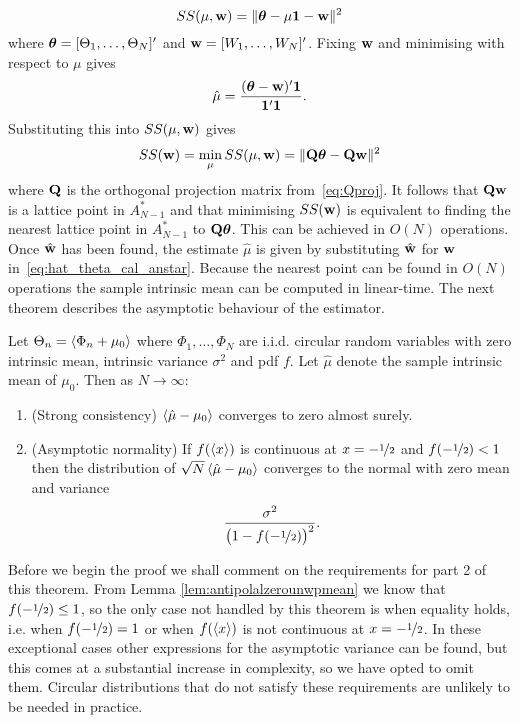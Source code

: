 \documentclass[journal]{../bib/IEEEtran}
\begin{document}
\[
SS(\mu, \mathbf{w}) = \| \boldsymbol{\theta} - \mu\boldsymbol{1} - \mathbf{w} \|^2
\]
where $\boldsymbol{\theta} = [\Theta_1, \dots, \Theta_N]^\prime$ and $\mathbf{w} = [W_1, \dots, W_N]^\prime$.  Fixing $\mathbf{w}$ and minimising with respect to $\mu$ gives
\begin{equation} \label{eq:hat_theta_cal_anstar}
\hat{\mu} = \frac{\dotprod{(\thetabf - \wbf)}{\onebf}}{\dotprod{\onebf}{\onebf}}.
\end{equation}
Substituting this into $SS(\mu, \mathbf{w})$ gives
\[
SS(\mathbf{w}) = \min_{\mu}SS(\mu, \mathbf{w}) = \| \mathbf{Q}\boldsymbol{\theta} - \mathbf{Q}\mathbf{w} \|^2
\]
where $\mathbf{Q}$ is the orthogonal projection matrix from~\eqref{eq:Qproj}. It follows  that $\mathbf{Q}\mathbf{w}$ is a lattice point in $A_{N-1}^*$ and that minimising $SS(\mathbf{w})$ is equivalent to finding the nearest lattice point in $A_{N-1}^*$ to $\mathbf{Q}\boldsymbol{\theta}$.  This can be achieved in $O(N)$ operations. Once $\hat{\mathbf{w}}$ has been found, the estimate $\hat{\mu}$ is given by substituting $\hat{\mathbf{w}}$ for $\mathbf{w}$ in~\eqref{eq:hat_theta_cal_anstar}.  Because the nearest point can be found in $O(N)$ operations the sample intrinsic mean can be computed in linear-time. The next theorem describes the asymptotic behaviour of the estimator.

\begin{theorem}\label{thm:asymp_proof_m=0}
Let $\Theta_n = \left< \Phi_n + \mu_0 \right>$ where $\Phi_1, \dots, \Phi_N$ are i.i.d. circular random variables with zero intrinsic mean, intrinsic variance $\sigma^2$ and pdf $f$. Let $\hat{\mu}$ denote the sample intrinsic mean of $\mu_0$.  Then as $N\rightarrow\infty$:
\begin{enumerate}
\item (Strong consistency) $\left< \hat{\mu} - \mu_0 \right>$ converges to zero almost surely. 
\item (Asymptotic normality) If $f(\left< x \right>)$ is continuous at $x = -\nicefrac{1}{2}$ and $f(-\nicefrac{1}{2}) < 1$ then the distribution of $\sqrt{N}\left< \hat{\mu} - \mu_0 \right>$ converges to the normal with zero mean and variance
\begin{equation}\label{eq:asympvarm=0}
\frac{\sigma^2}{\big(1 - f(-\nicefrac{1}{2}) \big)^2}.
\end{equation}
\end{enumerate}
\end{theorem}
Before we begin the proof we shall comment on the requirements for part 2 of this theorem.  From Lemma \ref{lem:antipolalzerounwpmean} we know that $f(-\nicefrac{1}{2}) \leq 1$, so the only case not handled by this theorem is when equality holds, i.e. when $f(-\nicefrac{1}{2}) = 1$ or when $f(\left< x \right>)$ is not continuous at $x = -\nicefrac{1}{2}$. In these exceptional cases other expressions for the asymptotic variance can be found, but this comes at a substantial increase in complexity, so we have opted to omit them. Circular distributions that do not satisfy these requirements are unlikely to be needed in practice.
\end{document}
